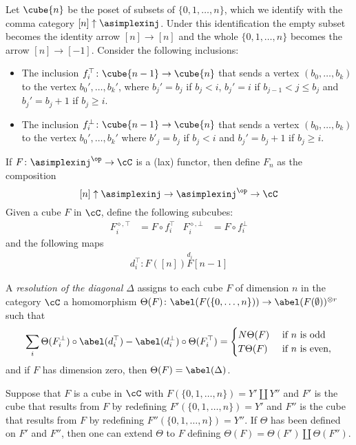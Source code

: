 Let $\cube{n}$ be the poset of subsets of $\{0,1,\ldots,n\}$, which we identify with the comma category $[n]\uparrow \asimplexinj$. Under this identification the empty subset becomes the identity arrow $[n]\to [n]$ and the whole $\{0,1,\ldots,n\}$ becomes the arrow $[n]\to [-1]$. Consider the following inclusions:
\begin{itemize}
    \item The inclusion $f_i^{\top}\colon \cube{n-1}\to \cube{n}$ that sends a vertex $(b_0,\ldots,b_k)$ to the vertex $b_0',\ldots,b_k'$, where $b_j' = b_j$ if $b_j<i$, $b_j' = i$ if $b_{j-1}<j\leq b_j$ and $b_j' = b_j+1$ if $b_j\geq i$.
    \item The inclusion $f_i^{\bot}\colon \cube{n-1}\to \cube{n}$ that sends a vertex $(b_0,\ldots,b_k)$ to the vertex $b_0',\ldots,b_k'$ where $b'_j = b_j$ if $b_j<i$ and $b_j' = b_j+1$ if $b_j\geq i$.
\end{itemize}
If $F\colon \asimplexinj^{\op}\to \cC$ is a (lax) functor, then define $F_n$ as the composition
    \[
    [n]\uparrow \asimplexinj\to \asimplexinj^{\op}\to \cC
    \]
Given a cube $F$ in $\cC$, define the following subcubes:
\begin{align*}
    F_{i}^{\diamond,\top} &= F\circ f_i^{\top} &
    F_{i}^{\diamond,\bot} &= F\circ f_i^{\bot}    
\end{align*}
and the following maps
\begin{align*}
    d_i^{\top}\colon F([n])\overset{d_i} F[n-1]
\end{align*}
\begin{definition}
    A \emph{resolution of the diagonal $\Delta$} assigns to each cube $F$ of dimension $n$ in the category $\cC$ a homomorphism $\Theta(F)\colon \abel(F(\{0,\ldots,n\}))\to \abel(F(\emptyset))^{\otimes r}$ such that
    \[
        \sum_i \Theta(F_i^{\bot})\circ \abel(d_i^{\top}) - \abel(d_i^{\bot})\circ\Theta(F_i^{\top}) = \begin{cases}
        N\Theta(F) & \text{ if $n$ is odd} \\
        T\Theta(F) & \text{ if $n$ is even},
        \end{cases}
    \]
    and if $F$ has dimension zero, then $\Theta(F) = \abel(\Delta)$.
\end{definition}
\begin{remark}
    Suppose that $F$ is a cube in $\cC$ with $F(\{0,1,\ldots,n\}) = Y'\amalg Y''$ and $F'$ is the cube that results from $F$ by redefining $F'(\{0,1,\ldots,n\}) = Y'$ and $F''$ is the cube that results from $F$ by redefining $F''(\{0,1,\ldots,n\}) = Y''$. If $\Theta$ has been defined on $F'$ and $F''$, then one can extend $\Theta$ to $F$ defining $\Theta(F) = \Theta(F')\amalg \Theta(F'')$.
\end{remark}
